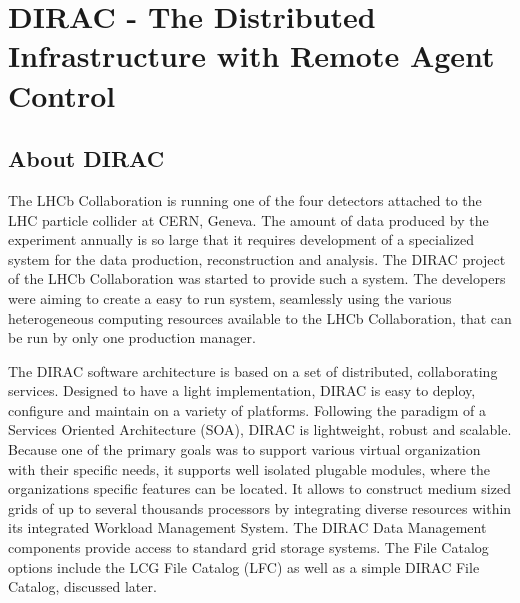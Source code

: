 \chapter{DIRAC - The Distributed Infrastructure with Remote Agent Control}

\section{About DIRAC}
The LHCb Collaboration\cite{LHCb} is running one of the four detectors attached to the LHC particle 
collider at CERN, Geneva. The amount of data produced by the experiment
annually is so large that it requires development of a specialized system for the data
production, reconstruction and analysis. The DIRAC project of the LHCb Collaboration was started to
provide such a system.\cite{Dir2} The developers were aiming to create a easy to run system, seamlessly using 
the various heterogeneous computing resources available to the LHCb Collaboration, that can be run by only one 
production manager. 

The DIRAC software architecture is based on a set of distributed, collaborating services. Designed to have a
light implementation, DIRAC is easy to deploy, configure and maintain on a variety of platforms. Following
the paradigm of a Services Oriented Architecture (SOA), DIRAC is lightweight, robust and scalable. Because one 
of the primary goals was to support various virtual organization with their specific needs, it supports well 
isolated plugable modules, where the organizations specific features can be located. It allows to construct medium
sized grids of up to several thousands processors by integrating diverse resources within its integrated Workload
Management System. The DIRAC Data Management components provide access to standard grid storage systems. 
The File Catalog options include the LCG File Catalog (LFC) as well as a simple DIRAC 
File Catalog, discussed later. 

